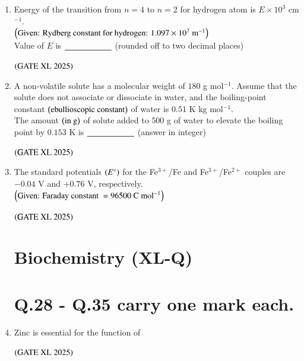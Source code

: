 \documentclass[journal]{IEEEtran}
\begin{document}
\begin{enumerate}
    \item Energy of the transition from $n = 4$ to $n = 2$ for hydrogen atom is $E \times 10^3$ cm$^{-1}$.\\
    $\left(\text{Given: Rydberg constant for hydrogen: } 1.097 \times 10^7\ \text{m}^{-1}\right)$\\
    Value of $E$ is $\underline{\rule{2cm}{0pt}}$ (rounded off to two decimal places)

    \hfill $\left(\text{GATE XL 2025}\right)$

    \item A non-volatile solute has a molecular weight of $180$ g mol$^{-1}$. Assume that the solute does not associate or dissociate in water, and the boiling-point constant $\left(\text{ebullioscopic constant}\right)$ of water is $0.51$ K kg mol$^{-1}$.\\
    The amount $\left(\text{in g}\right)$ of solute added to $500$ g of water to elevate the boiling point by $0.153$ K is $\underline{\rule{2cm}{0pt}}$ (answer in integer)

    \hfill $\left(\text{GATE XL 2025}\right)$

    \item The standard potentials $\left(E^\circ\right)$ for the Fe$^{3+}$/Fe and Fe$^{3+}$/Fe$^{2+}$ couples are $-0.04$ V and $+0.76$ V, respectively.\\
    $\left(\text{Given: Faraday constant } = 96500\ \text{C mol}^{-1}\right)$

    \hfill $\left(\text{GATE XL 2025}\right)$

\section*{Biochemistry (XL-Q)}
\section*{Q.28 - Q.35 carry one mark each.}

    \item Zinc is essential for the function of

    \hfill $\left(\text{GATE XL 2025}\right)$

    \begin{enumerate}
    \end{enumerate}


\end{enumerate}
\end{document}
